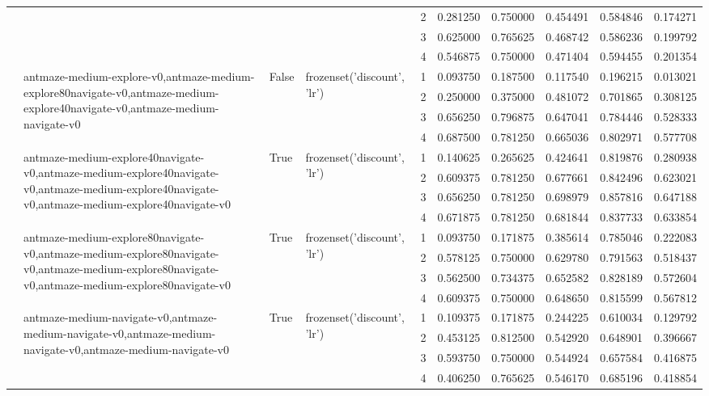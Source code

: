 \begin{tabular}{lllllrrrrr}
 &  &  &  & 2 & 0.281250 & 0.750000 & 0.454491 & 0.584846 & 0.174271 \\
 &  &  &  & 3 & 0.625000 & 0.765625 & 0.468742 & 0.586236 & 0.199792 \\
 &  &  &  & 4 & 0.546875 & 0.750000 & 0.471404 & 0.594455 & 0.201354 \\
\cline{2-10} \cline{3-10} \cline{4-10}
 & \multirow[t]{4}{*}{antmaze-medium-explore-v0,antmaze-medium-explore80navigate-v0,antmaze-medium-explore40navigate-v0,antmaze-medium-navigate-v0} & \multirow[t]{4}{*}{False} & \multirow[t]{4}{*}{frozenset({'discount', 'lr'})} & 1 & 0.093750 & 0.187500 & 0.117540 & 0.196215 & 0.013021 \\
 &  &  &  & 2 & 0.250000 & 0.375000 & 0.481072 & 0.701865 & 0.308125 \\
 &  &  &  & 3 & 0.656250 & 0.796875 & 0.647041 & 0.784446 & 0.528333 \\
 &  &  &  & 4 & 0.687500 & 0.781250 & 0.665036 & 0.802971 & 0.577708 \\
\cline{2-10} \cline{3-10} \cline{4-10}
 & \multirow[t]{4}{*}{antmaze-medium-explore40navigate-v0,antmaze-medium-explore40navigate-v0,antmaze-medium-explore40navigate-v0,antmaze-medium-explore40navigate-v0} & \multirow[t]{4}{*}{True} & \multirow[t]{4}{*}{frozenset({'discount', 'lr'})} & 1 & 0.140625 & 0.265625 & 0.424641 & 0.819876 & 0.280938 \\
 &  &  &  & 2 & 0.609375 & 0.781250 & 0.677661 & 0.842496 & 0.623021 \\
 &  &  &  & 3 & 0.656250 & 0.781250 & 0.698979 & 0.857816 & 0.647188 \\
 &  &  &  & 4 & 0.671875 & 0.781250 & 0.681844 & 0.837733 & 0.633854 \\
\cline{2-10} \cline{3-10} \cline{4-10}
 & \multirow[t]{4}{*}{antmaze-medium-explore80navigate-v0,antmaze-medium-explore80navigate-v0,antmaze-medium-explore80navigate-v0,antmaze-medium-explore80navigate-v0} & \multirow[t]{4}{*}{True} & \multirow[t]{4}{*}{frozenset({'discount', 'lr'})} & 1 & 0.093750 & 0.171875 & 0.385614 & 0.785046 & 0.222083 \\
 &  &  &  & 2 & 0.578125 & 0.750000 & 0.629780 & 0.791563 & 0.518437 \\
 &  &  &  & 3 & 0.562500 & 0.734375 & 0.652582 & 0.828189 & 0.572604 \\
 &  &  &  & 4 & 0.609375 & 0.750000 & 0.648650 & 0.815599 & 0.567812 \\
\cline{2-10} \cline{3-10} \cline{4-10}
 & \multirow[t]{4}{*}{antmaze-medium-navigate-v0,antmaze-medium-navigate-v0,antmaze-medium-navigate-v0,antmaze-medium-navigate-v0} & \multirow[t]{4}{*}{True} & \multirow[t]{4}{*}{frozenset({'discount', 'lr'})} & 1 & 0.109375 & 0.171875 & 0.244225 & 0.610034 & 0.129792 \\
 &  &  &  & 2 & 0.453125 & 0.812500 & 0.542920 & 0.648901 & 0.396667 \\
 &  &  &  & 3 & 0.593750 & 0.750000 & 0.544924 & 0.657584 & 0.416875 \\
 &  &  &  & 4 & 0.406250 & 0.765625 & 0.546170 & 0.685196 & 0.418854 \\
\cline{1-10} \cline{2-10} \cline{3-10} \cline{4-10}
\bottomrule
\end{tabular}
